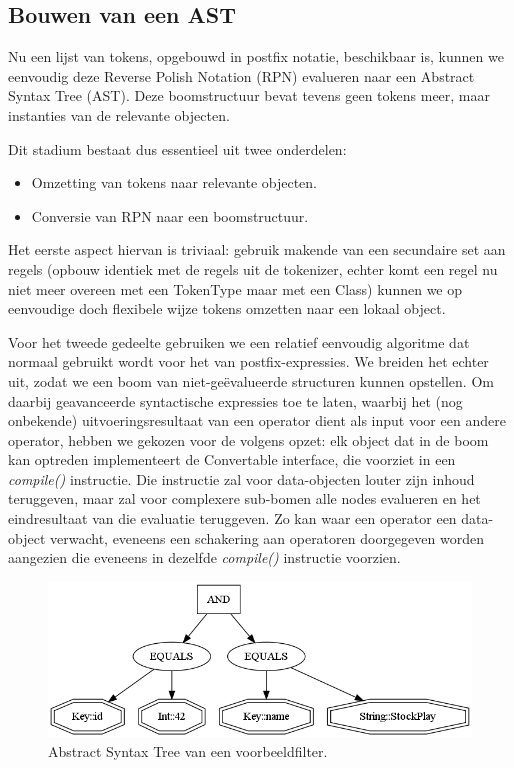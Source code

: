 \subsection{Bouwen van een AST}

Nu een lijst van tokens, opgebouwd in postfix notatie, beschikbaar is, kunnen we eenvoudig deze Reverse Polish Notation (RPN) evalueren naar een Abstract Syntax Tree (AST). Deze boomstructuur bevat tevens geen tokens meer, maar instanties van de relevante objecten.

Dit stadium bestaat dus essentieel uit twee onderdelen:
\begin{itemize}
\item Omzetting van tokens naar relevante objecten.
\item Conversie van RPN naar een boomstructuur.
\end{itemize}

Het eerste aspect hiervan is triviaal: gebruik makende van een secundaire set aan regels (opbouw identiek met de regels uit de tokenizer, echter komt een regel nu niet meer overeen met een TokenType maar met een Class) kunnen we op eenvoudige doch flexibele wijze tokens omzetten naar een lokaal object.

Voor het tweede gedeelte gebruiken we een relatief eenvoudig algoritme dat normaal gebruikt wordt voor het  van postfix-expressies. We breiden het echter uit, zodat we een boom van niet-ge\"evalueerde structuren kunnen opstellen. Om daarbij geavanceerde syntactische expressies toe te laten, waarbij het (nog onbekende) uitvoeringsresultaat van een operator dient als input voor een andere operator, hebben we gekozen voor de volgens opzet: elk object dat in de boom kan optreden implementeert de Convertable interface, die voorziet in een \emph{compile()} instructie. Die instructie zal voor data-objecten louter zijn inhoud teruggeven, maar zal voor complexere sub-bomen alle nodes evalueren en het eindresultaat van die evaluatie teruggeven. Zo kan waar een operator een data-object verwacht, eveneens een schakering aan operatoren doorgegeven worden aangezien die eveneens in dezelfde \emph{compile()} instructie voorzien.

\begin{figure}[h!]
	\centering
		\includegraphics[width=\textwidth]{images/realisatie/AST}
	\caption{Abstract Syntax Tree van een voorbeeldfilter.}
\end{figure}


